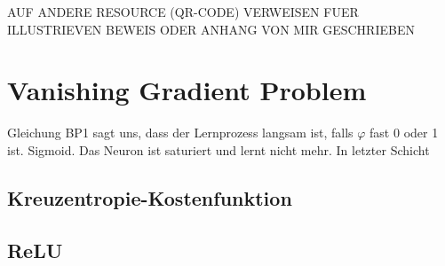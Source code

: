AUF ANDERE RESOURCE (QR-CODE) VERWEISEN FUER ILLUSTRIEVEN BEWEIS ODER ANHANG VON
MIR GESCHRIEBEN

\cite{wiki:uat}

\section{Vanishing Gradient Problem}

Gleichung BP1 sagt uns, dass der Lernprozess langsam ist, falls $\varphi$ fast 0
oder 1 ist. Sigmoid. Das Neuron ist saturiert und lernt nicht mehr. In letzter Schicht

\subsection{Kreuzentropie-Kostenfunktion}

\subsection{ReLU}

\pagebreak
